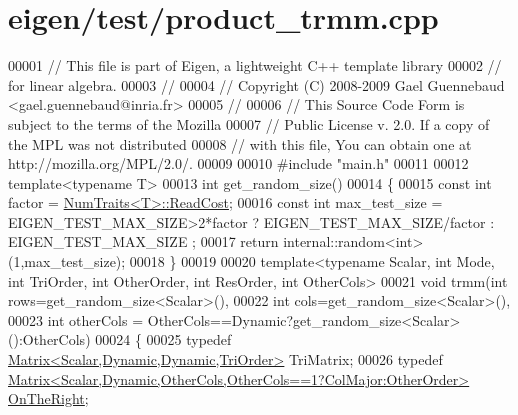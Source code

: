 \hypertarget{eigen_2test_2product__trmm_8cpp_source}{}\section{eigen/test/product\+\_\+trmm.cpp}
\label{eigen_2test_2product__trmm_8cpp_source}

\begin{DoxyCode}
00001 \textcolor{comment}{// This file is part of Eigen, a lightweight C++ template library}
00002 \textcolor{comment}{// for linear algebra.}
00003 \textcolor{comment}{//}
00004 \textcolor{comment}{// Copyright (C) 2008-2009 Gael Guennebaud <gael.guennebaud@inria.fr>}
00005 \textcolor{comment}{//}
00006 \textcolor{comment}{// This Source Code Form is subject to the terms of the Mozilla}
00007 \textcolor{comment}{// Public License v. 2.0. If a copy of the MPL was not distributed}
00008 \textcolor{comment}{// with this file, You can obtain one at http://mozilla.org/MPL/2.0/.}
00009 
00010 \textcolor{preprocessor}{#include "main.h"}
00011 
00012 \textcolor{keyword}{template}<\textcolor{keyword}{typename} T>
00013 \textcolor{keywordtype}{int} get\_random\_size()
00014 \{
00015   \textcolor{keyword}{const} \textcolor{keywordtype}{int} factor = \hyperlink{group___core___module_struct_eigen_1_1_num_traits}{NumTraits<T>::ReadCost};
00016   \textcolor{keyword}{const} \textcolor{keywordtype}{int} max\_test\_size = EIGEN\_TEST\_MAX\_SIZE>2*factor ? EIGEN\_TEST\_MAX\_SIZE/factor : EIGEN\_TEST\_MAX\_SIZE
      ;
00017   \textcolor{keywordflow}{return} internal::random<int>(1,max\_test\_size);
00018 \}
00019 
00020 \textcolor{keyword}{template}<\textcolor{keyword}{typename} Scalar, \textcolor{keywordtype}{int} Mode, \textcolor{keywordtype}{int} TriOrder, \textcolor{keywordtype}{int} OtherOrder, \textcolor{keywordtype}{int} ResOrder, \textcolor{keywordtype}{int} OtherCols>
00021 \textcolor{keywordtype}{void} trmm(\textcolor{keywordtype}{int} rows=get\_random\_size<Scalar>(),
00022           \textcolor{keywordtype}{int} cols=get\_random\_size<Scalar>(),
00023           \textcolor{keywordtype}{int} otherCols = OtherCols==Dynamic?get\_random\_size<Scalar>():OtherCols)
00024 \{
00025   \textcolor{keyword}{typedef} \hyperlink{group___core___module_class_eigen_1_1_matrix}{Matrix<Scalar,Dynamic,Dynamic,TriOrder>} TriMatrix;
00026   \textcolor{keyword}{typedef} \hyperlink{group___core___module_class_eigen_1_1_matrix}{Matrix<Scalar,Dynamic,OtherCols,OtherCols==1?ColMajor:OtherOrder>}
       \hyperlink{group__enums_ggac22de43beeac7a78b384f99bed5cee0ba99dc75d8e00b6c3a5bdc31940f47492b}{OnTheRight};

\end{DoxyCode}
